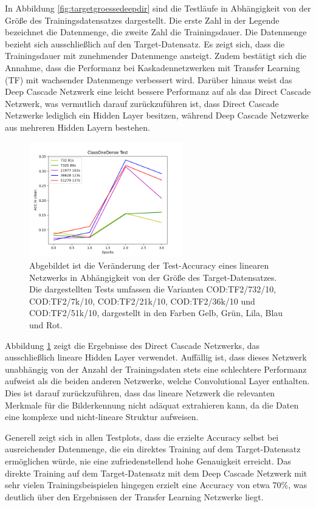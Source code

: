 In Abbildung \ref{fig:targetgroessedeepdir} sind die Testläufe in Abhängigkeit von der Größe des Trainingsdatensatzes dargestellt. Die erste 
Zahl in der Legende bezeichnet die Datenmenge, die zweite Zahl die Trainingsdauer. Die Datenmenge bezieht sich ausschließlich auf den 
Target-Datensatz. Es zeigt sich, dass die Trainingsdauer mit zunehmender Datenmenge ansteigt. Zudem bestätigt sich die Annahme, dass die 
Performanz bei Kaskadennetzwerken mit Transfer Learning (TF) mit wachsender Datenmenge verbessert wird. Darüber hinaus weist das Deep Cascade 
Netzwerk eine leicht bessere Performanz auf als das Direct Cascade Netzwerk, was vermutlich darauf zurückzuführen ist, dass Direct Cascade 
Netzwerke lediglich ein Hidden Layer besitzen, während Deep Cascade Netzwerke aus mehreren Hidden Layern bestehen.

\begin{figure}[htpb]
    \centering
    \includegraphics[height=5cm]{../../Plots/ba_plots/targetgroesse/cod_ts.png}
    \caption{\label{fig:targetgroesselinear} 
    \small{Abgebildet ist die Veränderung der Test-Accuracy eines linearen Netzwerks in Abhängigkeit von der Größe des Target-Datensatzes. 
    Die dargestellten Tests umfassen die Varianten COD:TF2/732/10, COD:TF2/7k/10, COD:TF2/21k/10, COD:TF2/36k/10 und COD:TF2/51k/10, 
    dargestellt in den Farben Gelb, Grün, Lila, Blau und Rot.}}
\end{figure}

Abbildung \ref{fig:targetgroesselinear} zeigt die Ergebnisse des Direct Cascade Netzwerks, das ausschließlich lineare Hidden Layer verwendet. 
Auffällig ist, dass dieses Netzwerk unabhängig von der Anzahl der Trainingsdaten stets eine schlechtere Performanz aufweist als die beiden 
anderen Netzwerke, welche Convolutional Layer enthalten. Dies ist darauf zurückzuführen, dass das lineare Netzwerk die relevanten Merkmale für 
die Bilderkennung nicht adäquat extrahieren kann, da die Daten eine komplexe und nicht-lineare Struktur aufweisen.

Generell zeigt sich in allen Testplots, dass die erzielte Accuracy selbst bei ausreichender Datenmenge, die ein direktes Training auf dem 
Target-Datensatz ermöglichen würde, nie eine zufriedenstellend hohe Genauigkeit erreicht. Das direkte Training auf dem Target-Datensatz mit dem 
Deep Cascade Netzwerk mit sehr vielen Trainingsbeispielen hingegen erzielt eine Accuracy von etwa 70\%, was deutlich über den Ergebnissen der 
Transfer Learning Netzwerke liegt.

